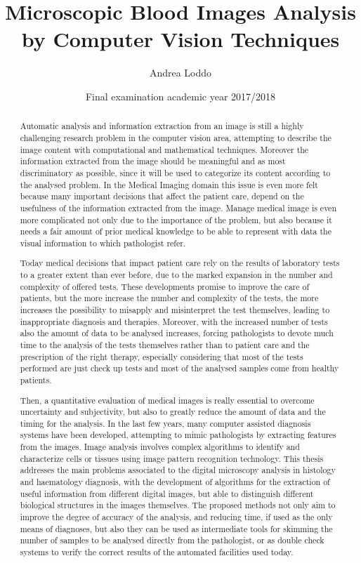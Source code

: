 \documentclass[final,a4paper,12pt,english]{UnicaPhdThesis3}
\title{Microscopic Blood Images Analysis by Computer Vision Techniques}
\author{Andrea Loddo}
\date{Final examination academic year 2017/2018}
\begin{document}
	
	\maketitle
	
	\begin{abstract} %
		Automatic analysis and information extraction from an image is still a highly challenging research problem in the computer vision area, attempting to describe the image content with computational and mathematical techniques. Moreover the information extracted from the image should be meaningful and as most discriminatory as possible, since it will be used to categorize its content according to the analysed problem. In the Medical Imaging domain this issue is even more felt because many important decisions that affect the patient care, depend on the usefulness of the information extracted from the image. Manage medical image is even more complicated not only due to the importance of the problem, but also because it needs a fair amount of prior medical knowledge to be able to represent with data the visual information to which pathologist refer. 
		
		Today medical decisions that impact patient care rely on the results of laboratory tests to a greater extent than ever before, due to the marked expansion in the number and complexity of offered tests. These developments promise to improve the care of patients, but the more increase the number and complexity of the tests, the more increases the possibility to misapply and misinterpret the test themselves, leading to inappropriate diagnosis and therapies.  Moreover, with the increased number of tests also the amount of data to be analysed increases, forcing pathologists to devote much time to the analysis of the tests themselves rather than to patient care and the prescription of the right therapy, especially considering that most of the tests performed are just check up tests and most of the analysed samples come from healthy patients.
		
		Then, a quantitative evaluation of medical images is really essential to overcome uncertainty and subjectivity, but also to greatly reduce the amount of data and the timing for the analysis. In the last few years, many computer assisted diagnosis systems have been developed, attempting to mimic pathologists by extracting features from the images. Image analysis involves complex algorithms to identify and characterize cells or tissues using image pattern recognition technology. This thesis addresses the main problems associated to the digital microscopy analysis in histology and haematology diagnosis, with the development of algorithms for the extraction of useful information from different digital images, but able to distinguish different biological structures in the images themselves. The proposed methods not only aim to improve the degree of accuracy of the analysis, and reducing time, if used as the only means of diagnoses, but also they can be used as intermediate tools for skimming the number of samples to be analysed directly from the pathologist, or as double check systems to verify the correct results of the automated facilities used today.
	\end{abstract}
	
\end{document}
